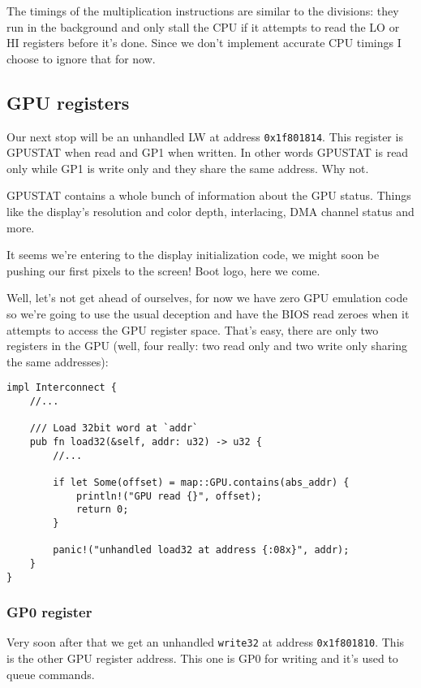 \documentclass[a4paper]{article}
\newcommand{\code}[1] {\texttt{#1}}
\begin{document}
The timings of the multiplication instructions are similar to the
divisions: they run in the background and only stall the CPU if it
attempts to read the LO or HI registers before it's done. Since we
don't implement accurate CPU timings I choose to ignore that for now.

\subsection{GPU registers}

Our next stop will be an unhandled LW at address
\code{0x1f801814}. This register is GPUSTAT when read and GP1 when
written. In other words GPUSTAT is read only while GP1 is write only
and they share the same address. Why not.

GPUSTAT contains a whole bunch of information about the GPU
status. Things like the display's resolution and color depth,
interlacing, DMA channel status and more.

It seems we're entering to the display initialization code, we might
soon be pushing our first pixels to the screen! Boot logo, here we
come.

Well, let's not get ahead of ourselves, for now we have zero GPU
emulation code so we're going to use the usual deception and have the
BIOS read zeroes when it attempts to access the GPU register
space. That's easy, there are only two registers in the GPU (well,
four really: two read only and two write only sharing the same
addresses):

\begin{lstlisting}
impl Interconnect {
    //...

    /// Load 32bit word at `addr`
    pub fn load32(&self, addr: u32) -> u32 {
        //...

        if let Some(offset) = map::GPU.contains(abs_addr) {
            println!("GPU read {}", offset);
            return 0;
        }

        panic!("unhandled load32 at address {:08x}", addr);
    }
}
\end{lstlisting}

\subsubsection{GP0 register}

Very soon after that we get an unhandled \code{write32} at address
\code{0x1f801810}. This is the other GPU register address. This one is
GP0 for writing and it's used to queue commands.
\end{document}
